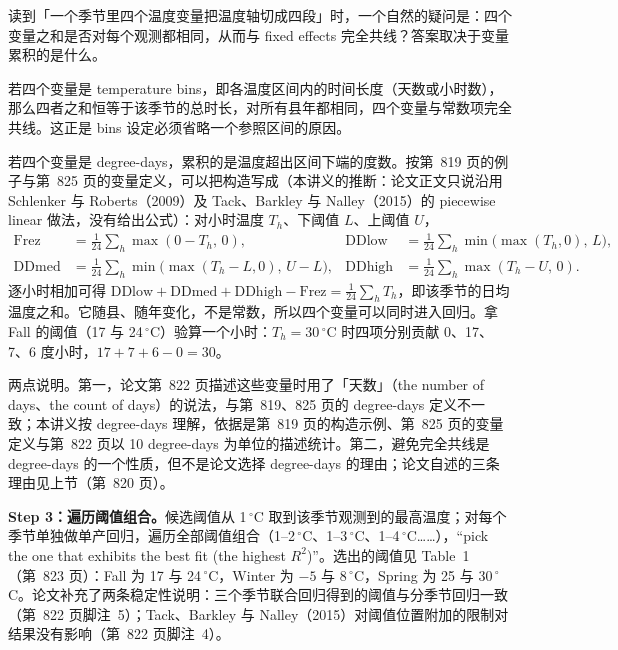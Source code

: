 \begin{intuition}
读到「一个季节里四个温度变量把温度轴切成四段」时，一个自然的疑问是：四个变量之和是否对每个观测都相同，从而与 fixed effects 完全共线？答案取决于变量累积的是什么。

若四个变量是 temperature bins，即各温度区间内的时间长度（天数或小时数），那么四者之和恒等于该季节的总时长，对所有县年都相同，四个变量与常数项完全共线。这正是 bins 设定必须省略一个参照区间的原因。

若四个变量是 degree-days，累积的是温度超出区间下端的度数。按第~819 页的例子与第~825 页的变量定义，可以把构造写成（本讲义的推断：论文正文只说沿用 Schlenker 与 Roberts（2009）及 Tack、Barkley 与 Nalley（2015）的 piecewise linear 做法，没有给出公式）：对小时温度 $T_h$、下阈值 $L$、上阈值 $U$，
\begin{align*}
\mathrm{Frez} &= \tfrac{1}{24}\sum_h \max(0-T_h,\,0), &
\mathrm{DDlow} &= \tfrac{1}{24}\sum_h \min\bigl(\max(T_h,0),\,L\bigr),\\
\mathrm{DDmed} &= \tfrac{1}{24}\sum_h \min\bigl(\max(T_h-L,0),\,U-L\bigr), &
\mathrm{DDhigh} &= \tfrac{1}{24}\sum_h \max(T_h-U,\,0).
\end{align*}
逐小时相加可得 $\mathrm{DDlow}+\mathrm{DDmed}+\mathrm{DDhigh}-\mathrm{Frez}=\tfrac{1}{24}\sum_h T_h$，即该季节的日均温度之和。它随县、随年变化，不是常数，所以四个变量可以同时进入回归。拿 Fall 的阈值（17 与 24\,$^\circ$C）验算一个小时：$T_h=30\,^\circ$C 时四项分别贡献 0、17、7、6 度小时，$17+7+6-0=30$。

两点说明。第一，论文第~822 页描述这些变量时用了「天数」（the number of days、the count of days）的说法，与第~819、825 页的 degree-days 定义不一致；本讲义按 degree-days 理解，依据是第~819 页的构造示例、第~825 页的变量定义与第~822 页以 10 degree-days 为单位的描述统计。第二，避免完全共线是 degree-days 的一个性质，但不是论文选择 degree-days 的理由；论文自述的三条理由见上节（第~820 页）。
\end{intuition}

\textbf{Step 3：遍历阈值组合。}候选阈值从 1\,$^\circ$C 取到该季节观测到的最高温度；对每个季节单独做单产回归，遍历全部阈值组合（1--2\,$^\circ$C、1--3\,$^\circ$C、1--4\,$^\circ$C……），``pick the one that exhibits the best fit (the highest $R^2$)''\citep[第~821 页]{da2024climate}。选出的阈值见 Table~1（第~823 页）：Fall 为 17 与 24\,$^\circ$C，Winter 为 $-5$ 与 8\,$^\circ$C，Spring 为 25 与 30\,$^\circ$C。论文补充了两条稳定性说明：三个季节联合回归得到的阈值与分季节回归一致（第~822 页脚注~5）；Tack、Barkley 与 Nalley（2015）对阈值位置附加的限制对结果没有影响（第~822 页脚注~4）。

